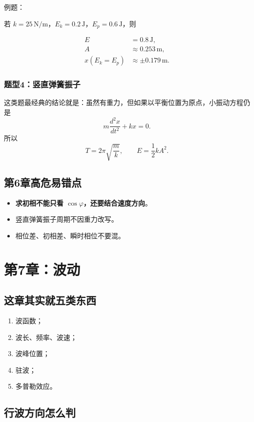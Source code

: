 \documentclass[12pt,a4paper]{article}
\newcommand{\warn}[1]{\textcolor{red!70!black}{\textbf{#1}}}
\begin{document}
例题：

若 $k=25\,\mathrm{N/m}$，$E_k=0.2\,\mathrm{J}$，$E_p=0.6\,\mathrm{J}$，则

\begin{align*}
E &= 0.8\,\mathrm{J},\\
A &\approx 0.253\,\mathrm{m},\\
x(E_k=E_p) &\approx \pm 0.179\,\mathrm{m}.
\end{align*}

\subsubsection*{题型4：竖直弹簧振子}

这类题最经典的结论就是：虽然有重力，但如果以平衡位置为原点，小振动方程仍是
\[
m\frac{d^2x}{dt^2} + kx = 0.
\]
所以
\[
T = 2\pi\sqrt{\frac{m}{k}},
\qquad
E = \frac12 kA^2.
\]

\subsection{第6章高危易错点}

\begin{itemize}
  \item \warn{求初相不能只看 $\cos\varphi$，还要结合速度方向}。
  \item 竖直弹簧振子周期不因重力改写。
  \item 相位差、初相差、瞬时相位不要混。
\end{itemize}

\section{第7章：波动}

\subsection{这章其实就五类东西}

\begin{enumerate}
  \item 波函数；
  \item 波长、频率、波速；
  \item 波峰位置；
  \item 驻波；
  \item 多普勒效应。
\end{enumerate}

\subsection{行波方向怎么判}
\end{document}
